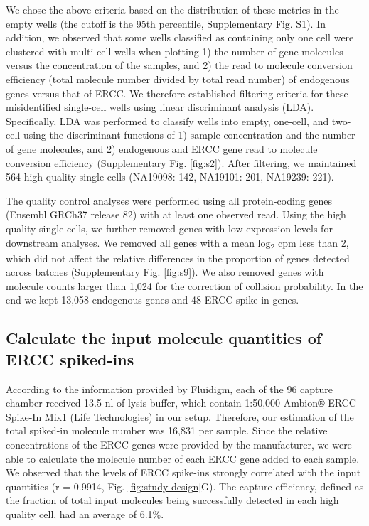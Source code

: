 We chose the above criteria based on the distribution of these metrics
in the empty wells (the cutoff is the 95th percentile, Supplementary
Fig. S1). In addition, we observed that some wells classified as
containing only one cell were clustered with multi-cell wells when
plotting 1) the number of gene molecules versus the concentration of the
samples, and 2) the read to molecule conversion efficiency (total
molecule number divided by total read number) of endogenous genes versus
that of ERCC. We therefore established filtering criteria for these
misidentified single-cell wells using linear discriminant analysis
(LDA). Specifically, LDA was performed to classify wells into empty,
one-cell, and two-cell using the discriminant functions of 1) sample
concentration and the number of gene molecules, and 2) endogenous and
ERCC gene read to molecule conversion efficiency (Supplementary Fig.
\ref{fig:s2}). After filtering, we maintained 564 high quality single cells
(NA19098: 142, NA19101: 201, NA19239: 221).

The quality control analyses were performed using all protein-coding
genes (Ensembl GRCh37 release 82) with at least one observed read. Using
the high quality single cells, we further removed genes with low
expression levels for downstream analyses. We removed all genes with a
mean log\textsubscript{2} cpm less than 2, which did not affect the
relative differences in the proportion of genes detected across batches
(Supplementary Fig. \ref{fig:s9}). We also removed genes with molecule counts
larger than 1,024 for the correction of collision probability. In the
end we kept 13,058 endogenous genes and 48 ERCC spike-in genes.

\subsection{Calculate the input molecule quantities of ERCC
spiked-ins}\label{calculate-the-input-molecule-quantities-of-ercc-spiked-ins}

According to the information provided by Fluidigm, each of the 96
capture chamber received 13.5 nl of lysis buffer, which contain 1:50,000
Ambion® ERCC Spike-In Mix1 (Life Technologies) in our setup. Therefore,
our estimation of the total spiked-in molecule number was 16,831 per
sample. Since the relative concentrations of the ERCC genes were
provided by the manufacturer, we were able to calculate the molecule
number of each ERCC gene added to each sample. We observed that the
levels of ERCC spike-ins strongly correlated with the input quantities
(r = 0.9914, Fig. \ref{fig:study-design}G). The capture efficiency, defined as the fraction
of total input molecules being successfully detected in each high
quality cell, had an average of 6.1\%.

